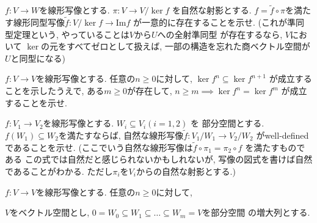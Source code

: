 \documentclass[lualatex]{exam}
\theoremstyle{remark}
\theoremstyle{plain}
\begin{document}
\begin{questions}
  \question $f:V \to W$を線形写像とする. $\pi :V \to  V/\mathord{\ker f} $ を自然な射影とする. 
   $f= \tilde{f} \circ \pi$を満たす線形同型写像$\tilde{f} : V /\mathord{\ker f} \to \mathrm{Im}f$
   が一意的に存在することを示せ. (これが準同型定理という, やっていることは$V $から$U$への全射準同型
   が存在するなら,  $V$において $\ker$の元をすべてゼロとして扱えば, 一部の構造を忘れた商ベクトル空間が
    $U$と同型になる)
   
  \question $f: V \to V$を線形写像とする. 任意の$n \geq 0$に対して,  $\ker f^n  \subseteq \ker f^{n+1}$
   が成立することを示したうえで, ある$m \geq 0$が存在して, $n\geq m \implies \ker f^n = \ker f^m$
   が成立することを示せ. 

  \question $f: V_1 \to V_2$を線形写像とする. $W_i \subseteq V_i \left( i =1,2 \right) $ を
  部分空間とする. $f(W_1) \subseteq W_2$を満たすならば, 自然な線形写像$\tilde{f} :V_1 /\mathord{W_1} \to V_2 /\mathord{W_2}$ 
  がwell-definedであることを示せ. (ここでいう自然な線形写像は$\tilde{f} \circ \pi_1 = \pi_2 \circ f$ を満たすものである
  この式では自然だと感じられないかもしれないが, 写像の図式を書けば自然であることがわかる. ただし$\pi_i$を$V_i$からの自然な射影とする.)

  \question $f: V\to V$を線形写像とする. 任意の$n \geq 0$に対して, 

  \question $V$をベクトル空間とし,  ${0} = W_0 \subseteq W_1 \subseteq \ldots \subseteq W_m = V$を部分空間
  の増大列とする. 
\end{questions}
\end{document}
